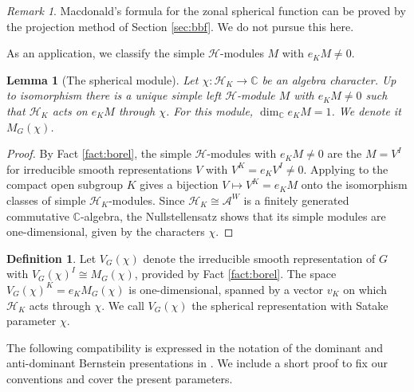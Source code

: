 \documentclass[12pt]{article}
\numberwithin{equation}{section}
\newtheorem{lemma}[theorem]{Lemma}
\theoremstyle{definition}
\newtheorem{definition}[theorem]{Definition}
\theoremstyle{remark}
\newtheorem{remark}[theorem]{Remark}
\theoremstyle{plain}
\begin{document}
\begin{remark}
Macdonald's formula for the zonal spherical function can be proved by the projection method of Section \ref{sec:bbf}. We do not pursue this here.
\end{remark}

As an application, we classify the simple $\mathcal{H}$-modules $M$ with $e_K M \neq 0$.

\begin{lemma}[The spherical module]\label{lem:spherical_unique}
Let $\chi : \mathcal{H}_K \to \mathbb{C}$ be an algebra character. Up to isomorphism there is a unique simple left $\mathcal{H}$-module $M$ with $e_K M \neq 0$ such that $\mathcal{H}_K$ acts on $e_K M$ through $\chi$. For this module, $\dim_{\mathbb{C}} e_K M = 1$. We denote it $M_G(\chi)$.
\end{lemma}
\begin{proof}
By Fact \ref{fact:borel}, the simple $\mathcal{H}$-modules with $e_K M \neq 0$ are the $M = V^I$ for irreducible smooth representations $V$ with $V^K = e_KV^I \neq 0$. Applying \cite[Proposition D.1.8]{Lau96} to the compact open subgroup $K$ gives a bijection $V \mapsto V^K = e_K M$ onto the isomorphism classes of simple $\mathcal{H}_K$-modules. Since $\mathcal{H}_K \cong \mathcal{A}^W$ is a finitely generated commutative $\mathbb{C}$-algebra, the Nullstellensatz shows that its simple modules are one-dimensional, given by the characters $\chi$.
\end{proof}

\begin{definition}\label{def:spherical_rep}
Let $V_G(\chi)$ denote the irreducible smooth representation of $G$ with $V_G(\chi)^I \cong M_G(\chi)$, provided by Fact \ref{fact:borel}. The space $V_G(\chi)^K = e_K M_G(\chi)$ is one-dimensional, spanned by a vector $v_K$ on which $\mathcal{H}_K$ acts through $\chi$. We call $V_G(\chi)$ the spherical representation with Satake parameter $\chi$.
\end{definition}

The following compatibility is expressed in the notation of the dominant and anti-dominant Bernstein presentations in \cite{HP02}. We include a short proof to fix our conventions and cover the present parameters.
\end{document}
